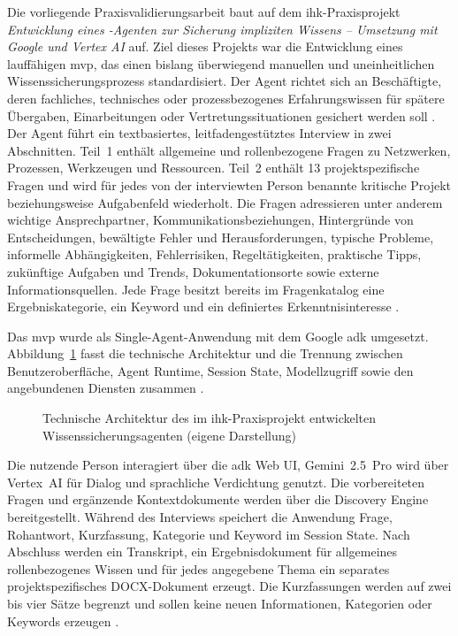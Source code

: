 \documentclass[
  10pt,
  ngerman,
  a4paper,
  toc=graduated,
  numbers=noenddot,
  headings=standardclasses,
  nonumberlist
]{scrartcl}
\begin{document}
Die vorliegende Praxisvalidierungsarbeit baut auf dem \gls{ihk}-Praxisprojekt \emph{Entwicklung eines -Agenten zur Sicherung impliziten Wissens -- Umsetzung mit Google  und Vertex AI} auf. Ziel dieses Projekts war die Entwicklung eines lauffähigen \gls{mvp}, das einen bislang überwiegend manuellen und uneinheitlichen Wissenssicherungsprozess standardisiert. Der Agent richtet sich an Beschäftigte, deren fachliches, technisches oder prozessbezogenes Erfahrungswissen für spätere Übergaben, Einarbeitungen oder Vertretungssituationen gesichert werden soll \cite[S.~1--2]{sommer2026projekt}.
Der Agent führt ein textbasiertes, leitfadengestütztes Interview in zwei Abschnitten. Teil~1 enthält allgemeine und rollenbezogene Fragen zu Netzwerken, Prozessen, Werkzeugen und Ressourcen. Teil~2 enthält 13 projektspezifische Fragen und wird für jedes von der interviewten Person benannte kritische Projekt beziehungsweise Aufgabenfeld wiederholt. Die Fragen adressieren unter anderem wichtige Ansprechpartner, Kommunikationsbeziehungen, Hintergründe von Entscheidungen, bewältigte Fehler und Herausforderungen, typische Probleme, informelle Abhängigkeiten, Fehlerrisiken, Regeltätigkeiten, praktische Tipps, zukünftige Aufgaben und Trends, Dokumentationsorte sowie externe Informationsquellen. Jede Frage besitzt bereits im Fragenkatalog eine Ergebniskategorie, ein Keyword und ein definiertes Erkenntnisinteresse \cite[S.~2]{sommer2026projekt}.

Das \gls{mvp} wurde als Single-Agent-Anwendung mit dem Google \gls{adk} umgesetzt. Abbildung~\ref{fig:ihk_architektur} fasst die technische Architektur und die Trennung zwischen Benutzeroberfläche, Agent Runtime, Session State, Modellzugriff sowie den angebundenen Diensten zusammen \cite[S.~9--12]{sommer2026projekt}.

\begin{figure}[htbp]
    \centering
    
    \caption{Technische Architektur des im \acrshort{ihk}-Praxisprojekt entwickelten Wissenssicherungsagenten (eigene Darstellung)}
    \label{fig:ihk_architektur}
\end{figure}

Die nutzende Person interagiert über die \gls{adk} Web UI, Gemini~2.5~Pro wird über Vertex~AI für Dialog und sprachliche Verdichtung genutzt. Die vorbereiteten Fragen und ergänzende Kontextdokumente werden über die Discovery Engine bereitgestellt. Während des Interviews speichert die Anwendung Frage, Rohantwort, Kurzfassung, Kategorie und Keyword im Session State. Nach Abschluss werden ein Transkript, ein Ergebnisdokument für allgemeines rollenbezogenes Wissen und für jedes angegebene Thema ein separates projektspezifisches DOCX-Dokument erzeugt. Die Kurzfassungen werden auf zwei bis vier Sätze begrenzt und sollen keine neuen Informationen, Kategorien oder Keywords erzeugen \cite[S.~9--12]{sommer2026projekt}.
\end{document}
